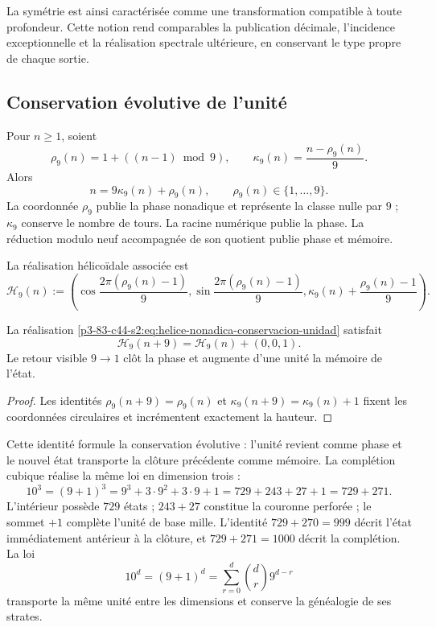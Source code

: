 La symétrie est ainsi caractérisée comme une transformation compatible à toute
profondeur. Cette notion rend comparables la publication décimale,
l'incidence exceptionnelle et la réalisation spectrale ultérieure, en conservant le
type propre de chaque sortie.

\subsection{Conservation évolutive de l'unité}

Pour \(n\geq1\), soient
\begin{equation}
 \rho_9(n)=1+((n-1)\bmod 9),
 \qquad
 \kappa_9(n)=\frac{n-\rho_9(n)}9.
 \label{p3-83-c44-s2:eq:residuo-cociente-conservacion-unidad}
\end{equation}
Alors
\[
 n=9\kappa_9(n)+\rho_9(n),
 \qquad
 \rho_9(n)\in\{1,\ldots,9\}.
\]
La coordonnée \(\rho_9\) publie la phase nonadique et représente la classe nulle
par \(9\) ; \(\kappa_9\) conserve le nombre de tours. La racine numérique
publie la phase. La réduction modulo neuf accompagnée de son quotient publie
phase et mémoire.

La réalisation hélicoïdale associée est
\begin{equation}
 \mathcal H_9(n):=
 \left(
 \cos\frac{2\pi(\rho_9(n)-1)}9,
 \sin\frac{2\pi(\rho_9(n)-1)}9,
 \kappa_9(n)+\frac{\rho_9(n)-1}{9}
 \right).
 \label{p3-83-c44-s2:eq:helice-nonadica-conservacion-unidad}
\end{equation}

\begin{proposition}
\label{p3-83-c44-s2:prop:retorno-fase-avance-memoria}
La réalisation \eqref{p3-83-c44-s2:eq:helice-nonadica-conservacion-unidad} satisfait
\[
 \mathcal H_9(n+9)=\mathcal H_9(n)+(0,0,1).
\]
Le retour visible \(9\to1\) clôt la phase et augmente d'une unité la mémoire
de l'état.
\end{proposition}

\begin{proof}
Les identités
\(\rho_9(n+9)=\rho_9(n)\) et
\(\kappa_9(n+9)=\kappa_9(n)+1\) fixent les coordonnées circulaires et
incrémentent exactement la hauteur.
\end{proof}

Cette identité formule la conservation évolutive : l'unité revient comme
phase et le nouvel état transporte la clôture précédente comme mémoire. La
complétion cubique réalise la même loi en dimension trois :
\begin{equation}
 10^3=(9+1)^3
 =9^3+3\cdot9^2+3\cdot9+1
 =729+243+27+1
 =729+271.
 \label{p3-83-c44-s2:eq:emrh-conservacion-evolutiva-unidad}
\end{equation}
L'intérieur possède \(729\) états ; \(243+27\) constitue la couronne
perforée ; le sommet \(+1\) complète l'unité de base mille. L'identité
\(729+270=999\) décrit l'état immédiatement antérieur à la clôture, et
\(729+271=1000\) décrit la complétion. La loi
\[
 10^d=(9+1)^d
 =\sum_{r=0}^{d}\binom dr9^{d-r}
\]
transporte la même unité entre les dimensions et conserve la généalogie de ses
strates.

